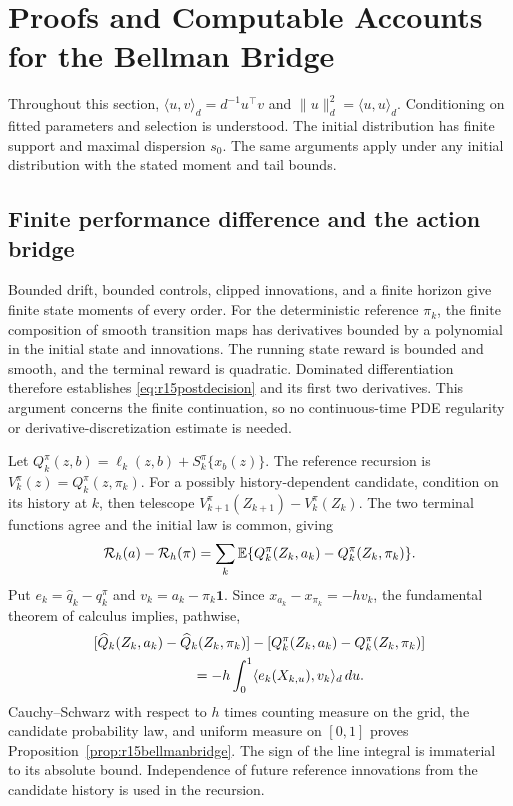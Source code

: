 \section{Proofs and Computable Accounts for the Bellman Bridge}
\label{app:r15bridge}
Throughout this section, $\langle u,v\rangle_d=d^{-1}u^\top v$ and
$\|u\|_d^2=\langle u,u\rangle_d$. Conditioning on fitted parameters
and selection is understood. The initial distribution has finite
support and maximal dispersion $s_0$. The same arguments apply under
any initial distribution with the stated moment and tail bounds.

\subsection{Finite performance difference and the action bridge}
Bounded drift, bounded controls, clipped innovations, and a finite
horizon give finite state moments of every order. For the deterministic
reference $\pi_k$, the finite composition of smooth transition maps has
derivatives bounded by a polynomial in the initial state and innovations.
The running state reward is bounded and smooth, and the terminal reward
is quadratic. Dominated differentiation therefore establishes
\eqref{eq:r15postdecision} and its first two derivatives. This argument
concerns the finite continuation, so no continuous-time PDE regularity
or derivative-discretization estimate is needed.

Let
$Q_k^\pi(z,b)=\ell_k(z,b)+S_k^\pi\{x_b(z)\}$.
The reference recursion is $V_k^\pi(z)=Q_k^\pi(z,\pi_k)$.
For a possibly history-dependent candidate, condition on its history
at $k$, then telescope $V_{k+1}^\pi(Z_{k+1})-V_k^\pi(Z_k)$.
The two terminal functions agree and the initial law is common, giving
\begin{equation}
 \mathcal R_h(a)-\mathcal R_h(\pi)
 =\sum_k\mathbb E\{Q_k^\pi(Z_k,a_k)-Q_k^\pi(Z_k,\pi_k)\}.
 \label{eq:r15telescoping}
\end{equation}
Put $e_k=\widehat q_k-q_k^\pi$ and
$v_k=a_k-\pi_k\bm1$. Since $x_{a_k}-x_{\pi_k}=-hv_k$, the
fundamental theorem of calculus implies, pathwise,
\begin{align*}
 &[\widehat Q_k(Z_k,a_k)-\widehat Q_k(Z_k,\pi_k)]
       -[Q_k^\pi(Z_k,a_k)-Q_k^\pi(Z_k,\pi_k)]\\
 &\hspace{25mm}=-h\int_0^1\langle e_k(X_{k,u}),v_k\rangle_d\,du.
\end{align*}
Cauchy--Schwarz with respect to $h$ times counting measure on the grid,
the candidate probability law, and uniform measure on $[0,1]$ proves
Proposition~\ref{prop:r15bellmanbridge}. The sign of the line integral
is immaterial to its absolute bound. Independence of future reference
innovations from the candidate history is used in the recursion.


